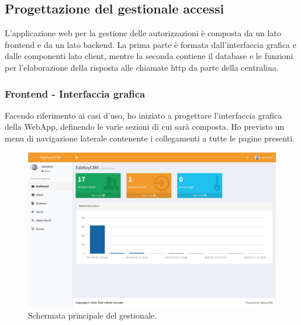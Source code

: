 
\subsection{Progettazione del gestionale accessi}
L'applicazione web per la gestione delle autorizzazioni è composta da un lato frontend e da un lato backend. La prima parte è formata dall'interfaccia grafica e dalle componenti lato client, mentre la seconda contiene il database e le funzioni per l'elaborazione della risposta alle chiamate http da parte della centralina.

\subsubsection{Frontend - Interfaccia grafica}
Facendo riferimento ai casi d'uso, ho iniziato a progettare l'interfaccia grafica della WebApp, definendo le varie sezioni di cui sarà composta.
Ho previsto un menu di navigazione laterale contenente i collegamenti a tutte le pagine presenti.

\begin{figure}[H]
	\begin{center}
	\includegraphics[scale=0.32]{immagini/dashboard_crm.png}
	\caption{Schermata principale del gestionale.}
	\end{center}
\end{figure}

